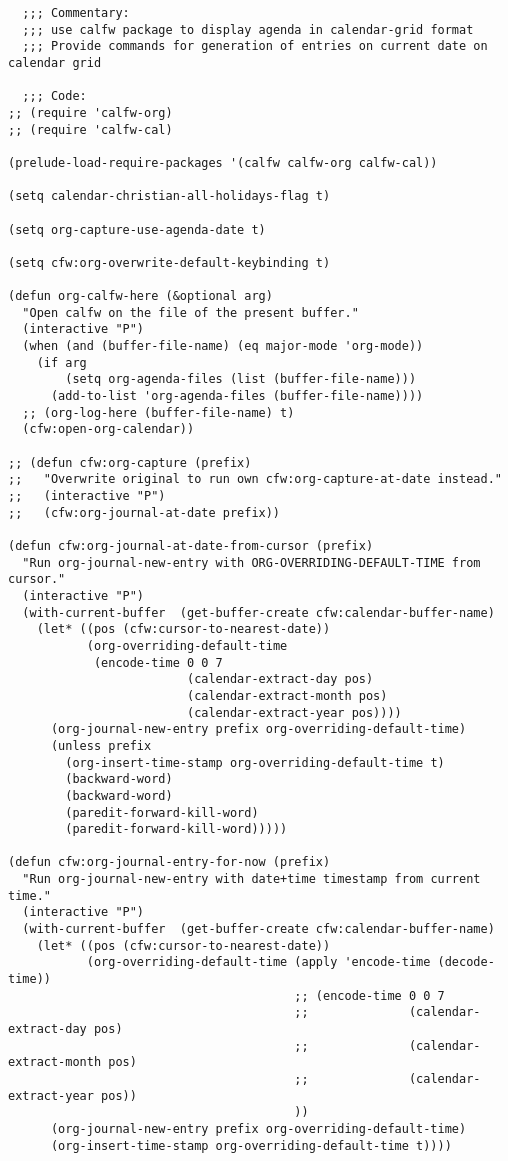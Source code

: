 \documentclass[11pt]{article}
\begin{document}
\begin{verbatim}
  ;;; Commentary:
  ;;; use calfw package to display agenda in calendar-grid format
  ;;; Provide commands for generation of entries on current date on calendar grid

  ;;; Code:
;; (require 'calfw-org)
;; (require 'calfw-cal)

(prelude-load-require-packages '(calfw calfw-org calfw-cal))

(setq calendar-christian-all-holidays-flag t)

(setq org-capture-use-agenda-date t)

(setq cfw:org-overwrite-default-keybinding t)

(defun org-calfw-here (&optional arg)
  "Open calfw on the file of the present buffer."
  (interactive "P")
  (when (and (buffer-file-name) (eq major-mode 'org-mode))
    (if arg
        (setq org-agenda-files (list (buffer-file-name)))
      (add-to-list 'org-agenda-files (buffer-file-name))))
  ;; (org-log-here (buffer-file-name) t)
  (cfw:open-org-calendar))

;; (defun cfw:org-capture (prefix)
;;   "Overwrite original to run own cfw:org-capture-at-date instead."
;;   (interactive "P")
;;   (cfw:org-journal-at-date prefix))

(defun cfw:org-journal-at-date-from-cursor (prefix)
  "Run org-journal-new-entry with ORG-OVERRIDING-DEFAULT-TIME from cursor."
  (interactive "P")
  (with-current-buffer  (get-buffer-create cfw:calendar-buffer-name)
    (let* ((pos (cfw:cursor-to-nearest-date))
           (org-overriding-default-time
            (encode-time 0 0 7
                         (calendar-extract-day pos)
                         (calendar-extract-month pos)
                         (calendar-extract-year pos))))
      (org-journal-new-entry prefix org-overriding-default-time)
      (unless prefix
        (org-insert-time-stamp org-overriding-default-time t)
        (backward-word)
        (backward-word)
        (paredit-forward-kill-word)
        (paredit-forward-kill-word)))))

(defun cfw:org-journal-entry-for-now (prefix)
  "Run org-journal-new-entry with date+time timestamp from current time."
  (interactive "P")
  (with-current-buffer  (get-buffer-create cfw:calendar-buffer-name)
    (let* ((pos (cfw:cursor-to-nearest-date))
           (org-overriding-default-time (apply 'encode-time (decode-time))
                                        ;; (encode-time 0 0 7
                                        ;;              (calendar-extract-day pos)
                                        ;;              (calendar-extract-month pos)
                                        ;;              (calendar-extract-year pos))
                                        ))
      (org-journal-new-entry prefix org-overriding-default-time)
      (org-insert-time-stamp org-overriding-default-time t))))


\end{verbatim}
\end{document}

